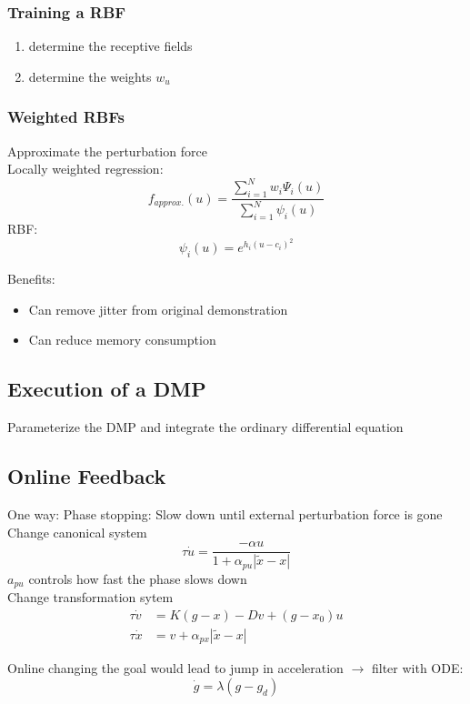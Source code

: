 \subsubsection{Training a RBF}%
\label{ar:ssub:training_a_rbf}
\begin{enumerate}
\item determine the receptive fields
\item determine the weights \(w_u\)
\end{enumerate}

\subsubsection{Weighted RBFs}%
\label{ar:ssub:weighted_rbfs}
Approximate the perturbation force\\
Locally weighted regression:
\[f_\mathit{approx.}(u) = \frac{\sum_{i=1}^N w_i \Psi_i(u)}{\sum_{i=1}^N \psi_i(u)}\]
RBF:
\[\psi_i(u) = e^{h_i (u-c_i)^2}\]

Benefits:
\begin{itemize}
\item Can remove jitter from original demonstration
\item Can reduce memory consumption
\end{itemize}

\subsection{Execution of a DMP}%
\label{ar:sub:execution_of_a_dmp}
Parameterize the DMP and integrate the ordinary differential equation

\subsection{Online Feedback}%
\label{ar:sub:online_feedback}
One way: Phase stopping: Slow down until external perturbation force is gone\\
Change canonical system
\[\tau\dot{u} = \frac{-\alpha u}{1 + \alpha_{pu}|\tilde{x} - x|}\]
\(a_{pu}\) controls how fast the phase slows down\\
Change transformation sytem
\begin{align*}
  \tau \dot{v} &= K (g-x) - Dv + (g - x_0)u\\
  \tau \dot{x} &= v + \alpha_{px}|\tilde{x} -x |
\end{align*}

Online changing the goal would lead to jump in acceleration \(\rightarrow\) filter with ODE:
\[\dot{g} = \lambda(g-g_d)\]

